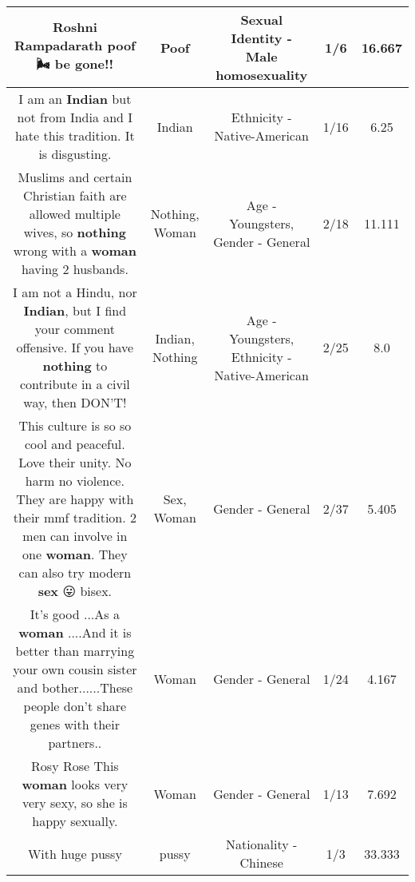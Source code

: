 \documentclass[11pt]{article}
\newlength\mylength
\begin{document}
\begin{center}
\begin{longtable}{|C{.65\mylength}|C{.30\mylength}|C{.12\mylength}|C{.12\mylength}|C{.12\mylength}|}
  \small Roshni Rampadarath \textbf{poof} 🌬 be gone!!\normalsize   & Poof & Sexual Identity - Male homosexuality & 1/6 & 16.667 \\  \hline
  \small I am an \textbf{Indian} but not from India and I hate this tradition.  It is disgusting.\normalsize   & Indian & Ethnicity - Native-American & 1/16 & 6.25 \\  \hline
  \small Muslims and certain Christian faith are allowed multiple wives, so \textbf{nothing} wrong  with a \textbf{woman} having 2 husbands.\normalsize   & Nothing, Woman & Age - Youngsters, Gender - General & 2/18 & 11.111 \\  \hline
  \small I am not a Hindu, nor \textbf{Indian}, but I find your comment offensive. If you have \textbf{nothing} to contribute in a civil way, then DON'T!\normalsize   & Indian, Nothing & Age - Youngsters, Ethnicity - Native-American & 2/25 & 8.0 \\  \hline
  \small This culture is so so cool and peaceful. Love their unity. No harm no violence. They are happy with their mmf tradition. 2 men can involve in one \textbf{woman}. They can also try modern \textbf{sex} 😛 bisex.\normalsize   & Sex, Woman & Gender - General & 2/37 & 5.405 \\  \hline
  \small It's good ...As a \textbf{woman} ....And  it is better than marrying your own cousin sister and bother......These people don't share genes with their partners..\normalsize   & Woman & Gender - General & 1/24 & 4.167 \\  \hline
  \small Rosy Rose This \textbf{woman} looks very very sexy, so she is happy sexually.\normalsize   & Woman & Gender - General & 1/13 & 7.692 \\  \hline
  \small With huge pussy\normalsize   & pussy & Nationality - Chinese & 1/3 & 33.333 \\  \hline

\end{longtable}
\end{center}
\end{document}
